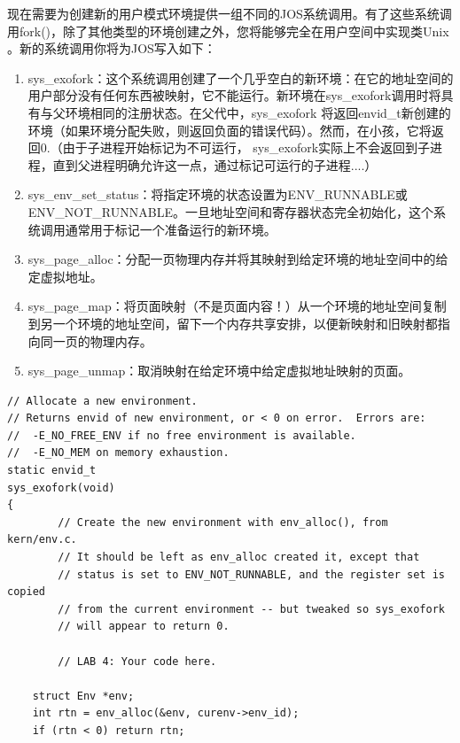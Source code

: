 \begin{ExerciseList}
现在需要为创建新的用户模式环境提供一组不同的JOS系统调用。有了这些系统调用fork()，除了其他类型的环境创建之外，您将能够完全在用户空间中实现类Unix 。新的系统调用你将为JOS写入如下：

\begin{enumerate}
\item sys\_exofork：这个系统调用创建了一个几乎空白的新环境：在它的地址空间的用户部分没有任何东西被映射，它不能运行。新环境在sys\_exofork调用时将具​​有与父环境相同的注册状态。在父代中，sys\_exofork 将返回envid\_t新创建的环境（如果环境分配失败，则返回负面的错误代码）。然而，在小孩，它将返回0.（由于子进程开始标记为不可运行， sys\_exofork实际上不会返回到子进程，直到父进程明确允许这一点，通过标记可运行的子进程....）
\item sys\_env\_set\_status：将指定环境的状态设置为ENV\_RUNNABLE或ENV\_NOT\_RUNNABLE。一旦地址空间和寄存器状态完全初始化，这个系统调用通常用于标记一个准备运行的新环境。
\item sys\_page\_alloc：分配一页物理内存并将其映射到给定环境的地址空间中的给定虚拟地址。
\item sys\_page\_map：将页面映射（不是页面内容！）从一个环境的地址空间复制到另一个环境的地址空间，留下一个内存共享安排，以便新映射和旧映射都指向同一页的物理内存。
\item sys\_page\_unmap：取消映射在给定环境中给定虚拟地址映射的页面。
\end{enumerate}



\begin{verbatim}
// Allocate a new environment.
// Returns envid of new environment, or < 0 on error.  Errors are:
//	-E_NO_FREE_ENV if no free environment is available.
//	-E_NO_MEM on memory exhaustion.
static envid_t
sys_exofork(void)
{
        // Create the new environment with env_alloc(), from kern/env.c.
        // It should be left as env_alloc created it, except that
        // status is set to ENV_NOT_RUNNABLE, and the register set is copied
        // from the current environment -- but tweaked so sys_exofork
        // will appear to return 0.

        // LAB 4: Your code here.

    struct Env *env;
    int rtn = env_alloc(&env, curenv->env_id);
    if (rtn < 0) return rtn;


\end{verbatim}
\end{ExerciseList}
